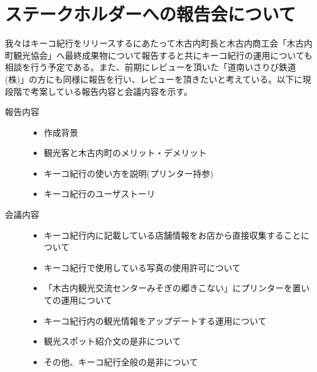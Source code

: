 \section{ステークホルダーへの報告会について}
我々はキーコ紀行をリリースするにあたって木古内町長と木古内商工会「木古内町観光協会」へ最終成果物について報告すると共にキーコ紀行の運用についても相談を行う予定である。また、前期にレビューを頂いた「道南いさりび鉄道(株)」の方にも同様に報告を行い、レビューを頂きたいと考えている。以下に現段階で考案している報告内容と会議内容を示す。
\begin{description}
 \item[報告内容]\mbox{}
 	\begin{itemize}
	\item 作成背景
	\item 観光客と木古内町のメリット・デメリット
	\item キーコ紀行の使い方を説明(プリンター持参)
	\item キーコ紀行のユーザストーリ \\
	\end{itemize}
 \item[会議内容]\mbox{}
	\begin{itemize}
	\item キーコ紀行内に記載している店舗情報をお店から直接収集することについて
	\item キーコ紀行で使用している写真の使用許可について
	\item 「木古内観光交流センターみそぎの郷きこない」にプリンターを置いての運用について
	\item キーコ紀行内の観光情報をアップデートする運用について
	\item 観光スポット紹介文の是非について
	\item その他、キーコ紀行全般の是非について
	\end{itemize}
\end{description}

